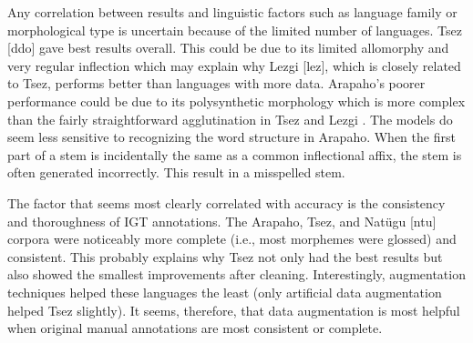 Any correlation between results and linguistic factors such as language family or morphological type is uncertain because of the limited number of languages. Tsez [ddo] gave best results overall. This could be due to its limited allomorphy and very regular inflection which may explain why Lezgi [lez], which is closely related to Tsez, performs better than languages with more data. Arapaho's poorer performance could be due to its polysynthetic morphology \citep{cowell_arapaho_2008} which is more complex than the fairly straightforward agglutination in Tsez \citep{job_tsez_1994} and Lezgi \citep{haspelmath_grammar_1993}. The models do seem less sensitive to recognizing the word structure in Arapaho. When the first part of a stem is incidentally the same as a common inflectional affix, the stem is often generated incorrectly. This result in a misspelled stem. 


The factor that seems most clearly correlated with accuracy is the consistency and thoroughness of IGT annotations. The Arapaho, Tsez, and  Nat\"ugu [ntu] corpora were noticeably more complete (i.e., most morphemes were glossed) and consistent. This probably explains why Tsez not only had the best results but also showed the smallest improvements after cleaning. Interestingly, augmentation techniques helped these languages the least (only artificial data augmentation helped Tsez slightly). It seems, therefore, that data augmentation is most helpful when original manual annotations are most consistent or complete. 

